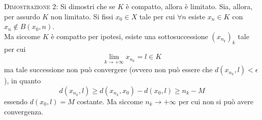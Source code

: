 \documentclass[a4paper]{extarticle}
\begin{document}
\vspace{2em}
\noindent
\normalfont \normalsize
\textsc{Dimostrazione 2}: Si dimostri che se $K$ è compatto, allora è limitato. Sia, allora, per assurdo $K$ non limitato. Si fissi $x_0 \in X$ tale per cui $\forall n$ esiste $x_n \in K$ con $x_n \notin B \left(x_0,n\right)$.\\
Ma siccome $K$ è compatto per ipotesi, esiste una sottosuccessione $(x_{n_k})_k$ tale per cui
\[\lim_{k \to +\infty} x_{n_k} = l \in K\]
ma tale successione non può convergere (ovvero non può essere che $d(x_{n_k},l)<\epsilon$), in quanto
\[d(x_{n_k},l) \geq d(x_{n_k},x_0) - d(x_0,l) \geq n_k - M\]
essendo $d(x_0,l)=M$ costante. Ma siccome $n_k \to +\infty$ per cui non si può avere convergenza.
\end{document}
